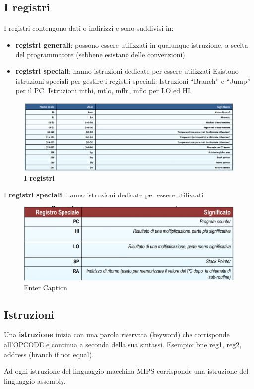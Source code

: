 \documentclass[12pt]{article}
\begin{document}
\subsection{I registri}
I registri contengono dati o indirizzi e sono suddivisi in:
\begin{itemize}
 \item \textbf{registri generali}: possono essere utilizzati in qualunque istruzione, a scelta del programmatore (sebbene esistano delle convenzioni)
\item \textbf{registri speciali}: hanno istruzioni dedicate per essere utilizzati
Esistono istruzioni speciali per gestire i registri speciali: Istruzioni “Branch” e “Jump” per il PC. Istruzioni mthi, mtlo, mfhi, mflo per LO ed HI.
\end{itemize}
\newpage
\begin{figure}[h]
\centering
\includegraphics[width=1\linewidth]{registrri-mars.png}
\caption{\textbf{I registri}}
\label{fig:enter-label}
\end{figure}
\vspace{\baselineskip}
I \textbf{registri speciali}: hanno istruzioni dedicate per essere utilizzati
\begin{figure}[h]
\centering
\includegraphics[width=1\linewidth]{registri speciali.png}
\caption{Enter Caption}
\label{fig:enter-label}
\end{figure}
\newpage
\subsection{Istruzioni}
Una \textbf{istruzione} inizia con una parola riservata (keyword) che corrisponde all’OPCODE e continua a seconda della sua sintassi. Esempio: bne reg1, reg2, address (branch if not equal).\par\medskip\noindent
Ad ogni istruzione del linguaggio macchina MIPS corrisponde una istruzione del linguaggio assembly.
\end{document}

